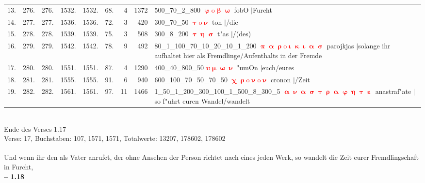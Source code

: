 \documentclass[a4paper,10pt,landscape]{article}
\begin{document}
\begin{tabular}{rrrrrrrrp{120mm}}
13.&276.&276.&1532.&1532.&68.&4&1372&500\_70\_2\_800 \textcolor{red}{$\boldsymbol{\upvarphi\mathrm{o}\upbeta\upomega}$} fobO $|$Furcht\\
14.&277.&277.&1536.&1536.&72.&3&420&300\_70\_50 \textcolor{red}{$\boldsymbol{\uptau\mathrm{o}\upnu}$} ton $|$/die\\
15.&278.&278.&1539.&1539.&75.&3&508&300\_8\_200 \textcolor{red}{$\boldsymbol{\uptau\upeta\upsigma}$} t"as $|$/(des)\\
16.&279.&279.&1542.&1542.&78.&9&492&80\_1\_100\_70\_10\_20\_10\_1\_200 \textcolor{red}{$\boldsymbol{\uppi\upalpha\uprho\mathrm{o}\upiota\upkappa\upiota\upalpha\upsigma}$} parojkjas $|$solange ihr aufhaltet hier als Fremdlinge/Aufenthalts in der Fremde\\
17.&280.&280.&1551.&1551.&87.&4&1290&400\_40\_800\_50 \textcolor{red}{$\boldsymbol{\upsilon\upmu\upomega\upnu}$} "umOn $|$euch/eures\\
18.&281.&281.&1555.&1555.&91.&6&940&600\_100\_70\_50\_70\_50 \textcolor{red}{$\boldsymbol{\upchi\uprho\mathrm{o}\upnu\mathrm{o}\upnu}$} cronon $|$/Zeit\\
19.&282.&282.&1561.&1561.&97.&11&1466&1\_50\_1\_200\_300\_100\_1\_500\_8\_300\_5 \textcolor{red}{$\boldsymbol{\upalpha\upnu\upalpha\upsigma\uptau\uprho\upalpha\upvarphi\upeta\uptau\upepsilon}$} anastraf"ate $|$so f"uhrt euren Wandel/wandelt\\
\end{tabular}\medskip \\
Ende des Verses 1.17\\
Verse: 17, Buchstaben: 107, 1571, 1571, Totalwerte: 13207, 178602, 178602\\
\\
Und wenn ihr den als Vater anrufet, der ohne Ansehen der Person richtet nach eines jeden Werk, so wandelt die Zeit eurer Fremdlingschaft in Furcht,\\
\newpage 
{\bf -- 1.18}\\
\medskip \\
\end{document}
